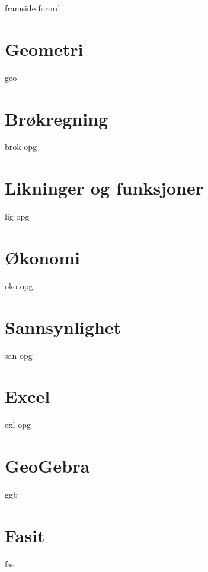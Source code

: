 




{framside}
{forord}

\tableofcontents

\chapter{Geometri}
{geo}

\chapter{Brøkregning \label{Br}}
\newpage
{brok}
\newpage
{opg}

\chapter{Likninger og funksjoner \label{Lig}}
{lig}
{opg}


\chapter{Økonomi \label{Oko}}
{oko}
{opg}

\chapter{Sannsynlighet \label{San}} 
{san}
{opg}
\newpage

\chapter*{Excel} 
{exl}	
\newpage
{opg}	


\chapter*{GeoGebra} 
{ggb}	

\chapter*{Fasit}
{fas}






